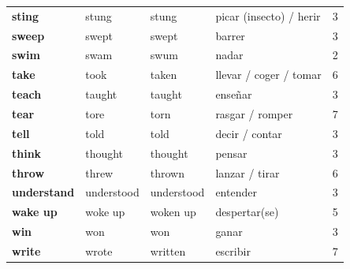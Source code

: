 \documentclass[11pt,a4paper]{article}
\begin{document}
\begin{longtable}{>{\bfseries}p{2.6cm}p{3.4cm}p{3.6cm}>{\raggedright\arraybackslash}p{6.0cm}c}
\textcolor{verdeO}{sting} & \textcolor{verdeO}{stung} & \textcolor{verdeO}{stung} & \textcolor{verdeO}{picar (insecto) / herir} & \textcolor{verdeO}{3}\\
\textcolor{verdeO}{sweep} & \textcolor{verdeO}{swept} & \textcolor{verdeO}{swept} & \textcolor{verdeO}{barrer} & \textcolor{verdeO}{3}\\
\textcolor{naranjaO}{swim} & \textcolor{naranjaO}{swam} & \textcolor{naranjaO}{swum} & \textcolor{naranjaO}{nadar} & \textcolor{naranjaO}{2}\\
\textcolor{rosaO}{take} & \textcolor{rosaO}{took} & \textcolor{rosaO}{taken} & \textcolor{rosaO}{llevar / coger / tomar} & \textcolor{rosaO}{6}\\
\textcolor{verdeO}{teach} & \textcolor{verdeO}{taught} & \textcolor{verdeO}{taught} & \textcolor{verdeO}{enseñar} & \textcolor{verdeO}{3}\\
\textcolor{azulO}{tear} & \textcolor{azulO}{tore} & \textcolor{azulO}{torn} & \textcolor{azulO}{rasgar / romper} & \textcolor{azulO}{7}\\
\textcolor{verdeO}{tell} & \textcolor{verdeO}{told} & \textcolor{verdeO}{told} & \textcolor{verdeO}{decir / contar} & \textcolor{verdeO}{3}\\
\textcolor{verdeO}{think} & \textcolor{verdeO}{thought} & \textcolor{verdeO}{thought} & \textcolor{verdeO}{pensar} & \textcolor{verdeO}{3}\\
\textcolor{rosaO}{throw} & \textcolor{rosaO}{threw} & \textcolor{rosaO}{thrown} & \textcolor{rosaO}{lanzar / tirar} & \textcolor{rosaO}{6}\\
\textcolor{verdeO}{understand} & \textcolor{verdeO}{understood} & \textcolor{verdeO}{understood} & \textcolor{verdeO}{entender} & \textcolor{verdeO}{3}\\
\textcolor{rojoO}{wake up} & \textcolor{rojoO}{woke up} & \textcolor{rojoO}{woken up} & \textcolor{rojoO}{despertar(se)} & \textcolor{rojoO}{5}\\
\textcolor{verdeO}{win} & \textcolor{verdeO}{won} & \textcolor{verdeO}{won} & \textcolor{verdeO}{ganar} & \textcolor{verdeO}{3}\\
\textcolor{azulO}{write} & \textcolor{azulO}{wrote} & \textcolor{azulO}{written} & \textcolor{azulO}{escribir} & \textcolor{azulO}{7}\\
\end{longtable}
\end{document}
